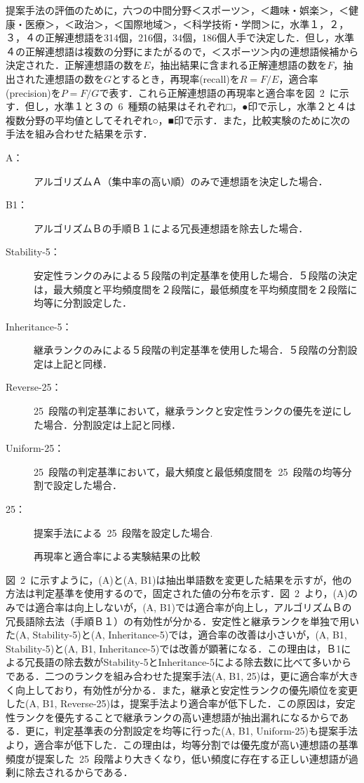 提案手法の評価のために，六つの中間分野＜スポーツ＞，＜趣味・娯楽＞，＜健康・医療＞，＜政治＞，＜国際地域＞，＜科学技術・学問＞に，水準１，２，３，４の正解連想語を314個，216個，34個，186個人手で決定した．但し，水準４の正解連想語は複数の分野にまたがるので，＜スポーツ＞内の連想語候補から決定された．正解連想語の数を$E$，抽出結果に含まれる正解連想語の数を$F$，抽出された連想語の数を$G$とするとき，再現率(recall)を$R=F/E$，適合率(precision)を$P=F/G$で表す．これら正解連想語の再現率と適合率を図~2~に示す．但し，水準１と３の~6~種類の結果はそれぞれ□，●印で示し，水準２と４は複数分野の平均値としてそれぞれ○，■印で示す．また，比較実験のために次の手法を組み合わせた結果を示す．
\begin{description}
\item[A：] アルゴリズムＡ（集中率の高い順）のみで連想語を決定した場合．
\item[B1：] アルゴリズムＢの手順Ｂ１による冗長連想語を除去した場合．
\item[Stability-5：] 安定性ランクのみによる５段階の判定基準を使用した場合．５段階の決定は，最大頻度と平均頻度間を２段階に，最低頻度を平均頻度間を２段階に均等に分割設定した．
\item[Inheritance-5：] 継承ランクのみによる５段階の判定基準を使用した場合．５段階の分割設定は上記と同様．
\item[Reverse-25：] 25~段階の判定基準において，継承ランクと安定性ランクの優先を逆にした場合．分割設定は上記と同様．
\item[Uniform-25：] 25~段階の判定基準において，最大頻度と最低頻度間を~25~段階の均等分割で設定した場合．
\item[25：] 提案手法による~25~段階を設定した場合.
\end{description}

\begin{figure}[t]
  \begin{center}
 
  \end{center}
  \caption{再現率と適合率による実験結果の比較}
\end{figure}

図~2~に示すように，(A)と(A, B1)は抽出単語数を変更した結果を示すが，他の方法は判定基準を使用するので，固定された値の分布を示す．図~2~より，(A)のみでは適合率は向上しないが，(A, B1)では適合率が向上し，アルゴリズムＢの冗長語除去法（手順Ｂ１）の有効性が分かる．安定性と継承ランクを単独で用いた(A, Stability-5)と(A, Inheritance-5)では，適合率の改善は小さいが，(A, B1, Stability-5)と(A, B1, Inheritance-5)では改善が顕著になる．この理由は，Ｂ1による冗長語の除去数がStability-5とInheritance-5による除去数に比べて多いからである．二つのランクを組み合わせた提案手法(A, B1, 25)は，更に適合率が大きく向上しており，有効性が分かる．また，継承と安定性ランクの優先順位を変更した(A, B1, Reverse-25)は，提案手法より適合率が低下した．この原因は，安定性ランクを優先することで継承ランクの高い連想語が抽出漏れになるからである．更に，判定基準表の分割設定を均等に行った(A, B1, Uniform-25)も提案手法より，適合率が低下した．この理由は，均等分割では優先度が高い連想語の基準頻度が提案した~25~段階より大きくなり，低い頻度に存在する正しい連想語が過剰に除去されるからである．

